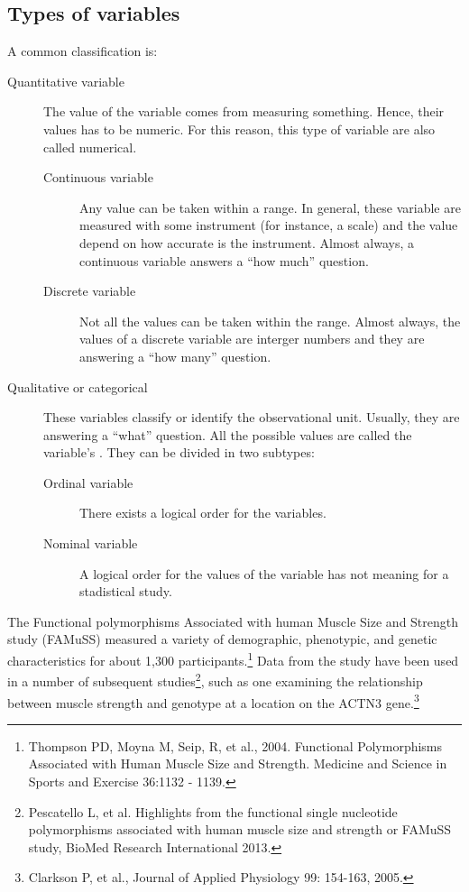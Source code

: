 

\subsection{Types of variables}
\label{variableTypes}

\begin{onebox}{A common classification is:} 

\begin{description}
\item[Quantitative variable] The value of the variable comes from measuring something. Hence, their values has to be numeric. For this reason, this type of variable are also called numerical. 
  \begin{description}
  \item[Continuous variable] Any value can be taken within a range. In general, these variable are measured with some instrument (for instance, a scale) and the value depend on how accurate is the instrument. Almost always, a continuous variable answers a ``how much'' question. 
\item[Discrete variable] Not all the values can be taken within the range. Almost always, the values of a discrete variable are interger numbers and they are answering a ``how many'' question.  
  \end{description}
\item[Qualitative or categorical] These variables classify or identify the observational unit. Usually, they are answering a ``what'' question. All the possible values are called the variable's . They can be divided in two subtypes:
  \begin{description}
  \item[Ordinal variable] There exists a logical order for the variables. 
  \item[Nominal variable] A logical order for the values of the variable has not meaning for a stadistical study. 
  \end{description}
\end{description}
  
  
\end{onebox}



The Functional polymorphisms Associated with human Muscle Size and Strength study (FAMuSS) measured a variety of demographic, phenotypic, and genetic characteristics for about 1,300 participants.\footnote{Thompson PD, Moyna M, Seip, R, et al., 2004.  Functional Polymorphisms Associated with Human Muscle Size and Strength.  Medicine and Science in Sports and Exercise 36:1132 - 1139.} Data from the study have been used in a number of subsequent studies\footnote{Pescatello L, et al. Highlights from the functional single nucleotide polymorphisms associated with human muscle size and strength or FAMuSS study, BioMed Research International 2013.}, such as one examining the relationship between muscle strength and genotype at a location on the ACTN3 gene.\footnote{Clarkson P, et al., Journal of Applied Physiology 99: 154-163, 2005.} 

